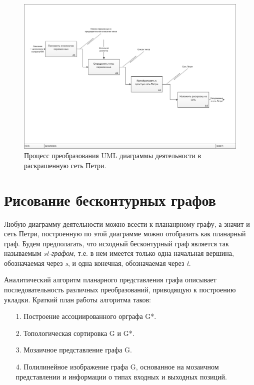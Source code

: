 \begin{figure}
	\begin{center}
		\includegraphics[width=\textwidth]{include/IDEF0ColouredPetri.png}
	\end{center}
	\caption{Процесс преобразования UML диаграммы деятельности в раскрашенную сеть Петри.}
	\label{fig:fig2}
\end{figure}

\section{Рисование бесконтурных графов}

Любую диаграмму деятельности можно всести к плананрному графу, а значит и сеть Петри, построенную по этой диаграмме можно отобразить как планарный граф. Будем предполагать, что исходный бесконтурный граф является так называемым \textit{st-графом}, т.е. в нем имеется только одна начальная вершина, обозначаемая через \textit{s}, и одна конечная, обозначаемая через \textit{t}.

Аналитический алгоритм планарного представления графа описывает последовательность различных преобразований, приводящую к построению укладки. \cite{Battista} Краткий план работы алгоритма таков:
\begin{enumerate}
\item[1.] Построение ассоциированного орграфа G*.
\item[2.] Топологическая сортировка G и G*.
\item[3.] Мозаичное представление графа G.
\item[4.] Полилинейное изображение графа G, основанное на мозаичном представлении и информации о типах входных и выходных позиций.
\end{enumerate}

